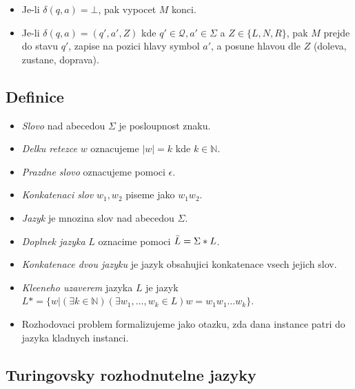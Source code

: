 \documentclass{article}
\theoremstyle{plain}
\theoremstyle{plain}
\theoremstyle{remark}
\begin{document}
\begin{itemize}
    \item Je-li $\delta(q, a) = \bot$, pak vypocet $M$ konci.
    \item Je-li $\delta(q, a) = (q', a', Z)$ kde $q' \in \mathcal{Q}, a' \in \Sigma$ a $Z \in \{ L, N, R\}$, pak $M$ prejde do stavu $q'$, zapise na pozici hlavy symbol $a'$, a posune hlavou dle $Z$ (doleva, zustane, doprava).
\end{itemize}

\subsection{Definice}

\begin{itemize}
    \item \emph{Slovo} nad abecedou $\Sigma$ je posloupnost znaku.
    \item \emph{Delku retezce} $w$ oznacujeme $|w| = k$ kde $k \in \mathbb{N}$.
    \item \emph{Prazdne slovo} oznacujeme pomoci $\epsilon$.
    \item \emph{Konkatenaci slov} $w_1, w_2$ piseme jako $w_1 w_2$.
    \item \emph{Jazyk} je mnozina slov nad abecedou $\Sigma$.
    \item \emph{Doplnek jazyka} $L$ oznacime pomoci $\bar{L} = \Sigma* \\ L$.
    \item \emph{Konkatenace dvou jazyku} je jazyk obsahujici konkatenace vsech jejich slov.
    \item \emph{Kleeneho uzaverem} jazyka $L$ je jazyk $L* = \{ w | (\exists k \in \mathbb{N}) (\exists w_1, \ldots, w_k \in L) w = w_1 w_1 \ldots w_k \}$.
    \item Rozhodovaci problem formalizujeme jako otazku, zda dana instance patri do jazyka kladnych instanci.
\end{itemize}

\subsection{Turingovsky rozhodnutelne jazyky}
\end{document}
